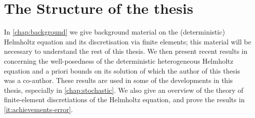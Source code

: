   
  


\section{The Structure of the thesis}

In \cref{chap:background} we give background material on the (deterministic) Helmholtz equation and its discretisation via finite elements; this material will be necessary to understand the rest of this thesis. We then present recent results in \cite{GrPeSp:19} concerning the well-posedness of the deterministic heterogeneous Helmholtz equation and a priori bounds on its solution of which the author of this thesis was a co-author. These results are used in some of the developments in this thesis, especially in \cref{chap:stochastic}. We also give an overview of the theory of finite-element discretiations of the Helmholtz equation, and prove the results in \cref{it:achievements-error}.

